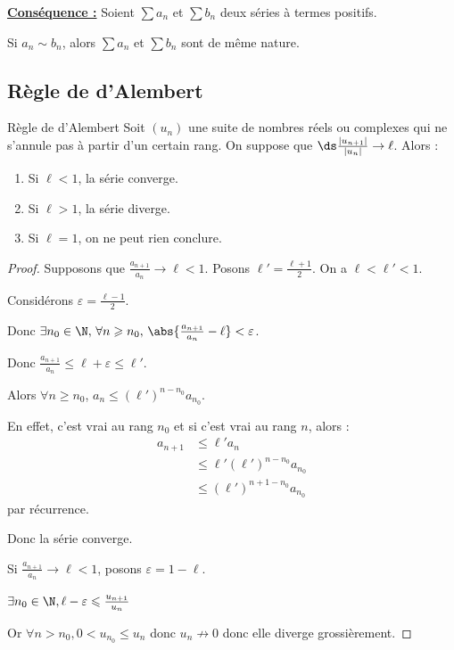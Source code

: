 \uline{\textbf{Conséquence :}} Soient $\sum a_n$ et $\sum b_n$ deux séries à termes positifs.

Si $a_n \sim b_n$, alors $\sum a_n$ et $\sum b_n$ sont de même nature.

\subsection{Règle de d'Alembert}

\begin{theoreme}{Règle de d'Alembert}{}
    Soit $(u_n)$ une suite de nombres réels ou complexes qui ne s'annule pas 
    à partir d'un certain rang. On suppose que $\ds \frac{|u_{n + 1}|}{|u_n|} \to \ell$.
    Alors : 
    
    \begin{enumerate}
        \item Si $\ell < 1$, la série converge.
        \item Si $\ell > 1$, la série diverge.
        \item Si $\ell = 1$, on ne peut rien conclure.
    \end{enumerate}
\end{theoreme}


\begin{proof}
    Supposons que $\frac{a_{n + 1 }}{a_n } \longrightarrow \ell < 1$. Posons $\ell' = \frac {\ell+1} 2$. On a $\ell < \ell' < 1$.

    Considérons $\varepsilon = \frac{\ell - 1 } 2 $.

    Donc $\exists n_0 \in \N, \, \forall n \geqslant n_0, \, \abs{\frac{a_{n + 1}}{a_n} - \ell} < \varepsilon$.

    Donc $\frac{a_{n + 1}}{a_n} \leqslant \ell + \varepsilon \leqslant \ell'$.

    Alors $\displaystyle \forall n \geqslant n_0$, $\displaystyle a_n \leqslant (\ell')^{n-n_0} a_{n_0}$.

    En effet, c'est vrai au rang $n_0$ et si c'est vrai au rang $n$, 
    alors :
    \begin{align*}
        a_{n + 1} & \leqslant \ell' a_n \\
                  & \leqslant \ell' (\ell')^{n - n_0} a_{n_0} \\
                  & \leqslant (\ell')^{n + 1 - n_0} a_{n_0}
    \end{align*} par récurrence. 

    Donc la série converge.

    Si $\frac{a_{n + 1}}{a_n} \longrightarrow \ell < 1$, posons $\varepsilon = 1 - \ell$.

    $\exists n_0 \in \N, \ell - \varepsilon \leqslant \frac {u_{n+1}} {u_n}$

    Or $\forall n > n_0, 0 < u_{n_0} \leqslant u_n$  donc $u_n \not \to 0$ donc elle diverge grossièrement.
\end{proof}

